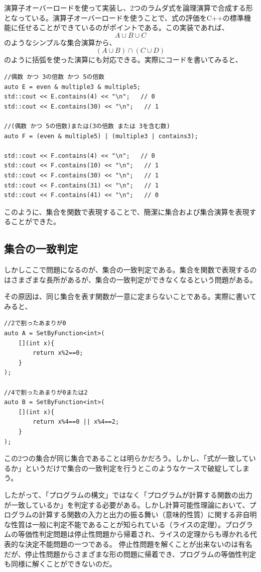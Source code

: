 \documentclass[a4paper,11pt]{ltjsarticle}
\begin{document}
演算子オーバーロードを使って実装し、2つのラムダ式を論理演算で合成する形となっている。演算子オーバーロードを使うことで、式の評価をC++の標準機能に任せることができているのがポイントである。この実装であれば、
$$A \cup B \cup C$$
のようなシンプルな集合演算から、
$$(A \cup B)\cap(C \cup D)$$
のように括弧を使った演算にも対応できる。実際にコードを書いてみると、
\begin{lstlisting}
//偶数 かつ 3の倍数 かつ 5の倍数
auto E = even & multiple3 & multiple5;
std::cout << E.contains(4) << "\n";   // 0
std::cout << E.contains(30) << "\n";   // 1

//(偶数 かつ 5の倍数)または(3の倍数 または 3を含む数)
auto F = (even & multiple5) | (multiple3 | contains3);

std::cout << F.contains(4) << "\n";   // 0
std::cout << F.contains(10) << "\n";   // 1
std::cout << F.contains(30) << "\n";   // 1
std::cout << F.contains(31) << "\n";   // 1
std::cout << F.contains(41) << "\n";   // 0
\end{lstlisting}
このように、集合を関数で表現することで、簡潔に集合および集合演算を表現することができた。
\subsection{集合の一致判定}
しかしここで問題になるのが、集合の一致判定である。集合を関数で表現するのはさまざまな長所があるが、集合の一致判定ができなくなるという問題がある。

その原因は、同じ集合を表す関数が一意に定まらないことである。実際に書いてみると、
\begin{lstlisting}
//2で割ったあまりが0
auto A = SetByFunction<int>(
    [](int x){
        return x%2==0;
    }
);

//4で割ったあまりが0または2
auto B = SetByFunction<int>(
    [](int x){
        return x%4==0 || x%4==2;
    }
);
\end{lstlisting}
この2つの集合が同じ集合であることは明らかだろう。しかし、「式が一致しているか」というだけで集合の一致判定を行うとこのようなケースで破綻してしまう。

したがって、「プログラムの構文」ではなく「プログラムが計算する関数の出力が一致しているか」を判定する必要がある。しかし計算可能性理論において、プログラムの計算する関数の入力と出力の振る舞い（意味的性質）に関する非自明な性質は一般に判定不能であることが知られている（ライスの定理\cite{Rice1953}）。プログラムの等価性判定問題は停止性問題から帰着され、ライスの定理からも導かれる代表的な決定不能問題の一つである。
停止性問題を解くことが出来ないのは有名だが、停止性問題からさまざまな形の問題に帰着でき、プログラムの等価性判定も同様に解くことができないのだ。
\end{document}
